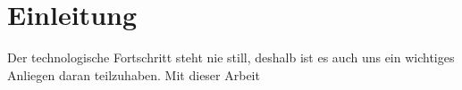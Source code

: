 \chapter{Einleitung}
Der technologische Fortschritt steht nie still, deshalb ist es auch uns ein wichtiges Anliegen daran teilzuhaben. Mit dieser Arbeit